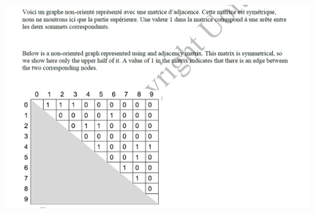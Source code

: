 \documentclass[12pt]{book}
\begin{document}
\newcommand{\reporttitle}{Devoir 8: Graphe}
\newcommand{\reportauthorOne}{Kien Do}
\newcommand{\cidOne}{300163370}






\includegraphics[scale=0.80]{graphQuestion.png}\\
\end{document}
